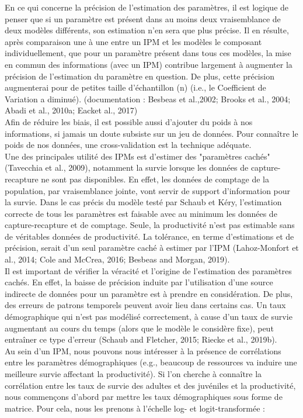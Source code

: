 \documentclass[12pt,a4paper]{article}
\begin{document}
En ce qui concerne la précision de l'estimation des paramètres, il est logique de penser que si un paramètre est présent dans au moins deux vraisemblance de deux modèles différents, son estimation n'en sera que plus précise.
Il en résulte, après comparaison une à une entre un IPM et les modèles le composant individuellement, que pour un paramètre présent dans tous ces modèles, la mise en commun des informations (avec un IPM) contribue largement à augmenter la précision de l'estimation du paramètre en question. De plus, cette précision augmenterai pour de petites taille d'échantillon (n) (i.e., le Coefficient de Variation a diminué). (documentation : Besbeas et al.,2002; Brooks et al., 2004; Abadi et al., 2010a; Eacket al., 2017)\\
Afin de réduire les biais, il est possible aussi d'ajouter du poids à nos informations, si jamais un doute subsiste sur un jeu de données. Pour connaître le poids de nos données, une cross-validation est la technique adéquate.\\
Une des principales utilité des IPMs est d'estimer des "paramètres cachés" (Tavecchia et al., 2009), notamment la survie lorsque les données de capture-recapture ne sont pas disponibles. En effet, les données de comptage de la population, par vraisemblance jointe, vont servir de support d'information pour la survie. Dans le cas précis du modèle testé par Schaub et Kéry, l'estimation correcte de tous les paramètres est faisable avec au minimum les données de capture-recapture et de comptage. Seule, la productivité n'est pas estimable sans de véritables données de productivité. La tolérance, en terme d'estimations et de précision, serait d'un seul paramètre caché à estimer par l'IPM (Lahoz-Monfort et al., 2014; Cole and McCrea, 2016; Besbeas and Morgan, 2019).\\
Il est important de vérifier la véracité et l'origine de l'estimation des paramètres cachés. En effet, la baisse de précision induite par l'utilisation d'une source indirecte de données pour un paramètre est à prendre en considération. De plus, des erreurs de patrons temporels peuvent avoir lieu dans certains cas. Un taux démographique qui n'est pas modélisé correctement, à cause d'un taux de survie augmentant au cours du temps (alors que le modèle le considère fixe), peut entraîner ce type d'erreur (Schaub and Fletcher, 2015; Riecke et al., 2019b).\\
Au sein d'un IPM, nous pouvons nous intéresser à la présence de corrélations entre les paramètres démographiques (e.g., beaucoup de ressources va induire une meilleure survie affectant la productivité). Si l'on cherche à connaître la corrélation entre les taux de survie des adultes et des juvéniles et la productivité, nous commençons d'abord par mettre les taux démographiques sous forme de matrice. Pour cela, nous les prenons à l'échelle log- et logit-transformée :
\end{document}
